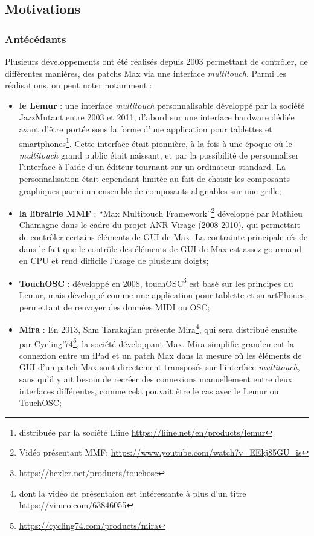 \subsection{Motivations}

\subsubsection{Antécédants} 

\noindent Plusieurs développements ont été réalisés depuis 2003 permettant de contrôler, de différentes manières, des patchs Max via une interface \textit{multitouch}. Parmi les réalisations, on peut noter notamment :
\vspace{-1em}
\begin{itemize}[noitemsep]
	\item \textbf{le Lemur} : une interface \textit{multitouch} personnalisable développé par la société JazzMutant entre 2003 et 2011, d'abord sur une interface hardware dédiée avant d'être portée sous la forme d'une application pour tablettes et smartphones\footnote{distribuée par la société Liine \url{https://liine.net/en/products/lemur}}. Cette interface était pionnière, à la fois à une époque où le \textit{multitouch} grand public était naissant, et par la possibilité de personnaliser l'interface à l'aide d'un éditeur tournant sur un ordinateur standard. La personnalisation était cependant limitée au fait de choisir les composants graphiques parmi un ensemble de composants alignables sur une grille;

	\item \textbf{la librairie MMF} : ``Max Multitouch Framework''\footnote{Vidéo présentant MMF: \url{https://www.youtube.com/watch?v=EEkj85GU_is}} développé par Mathieu Chamagne dans le cadre du projet \gls{ANR} Virage (2008-2010), qui permettait de contrôler certains éléments de \gls{GUI} de Max. La contrainte principale réside dans le fait que le contrôle des éléments de \gls{GUI} de Max est assez gourmand en \gls{CPU} et rend difficile l'usage de plusieurs doigts;

	\item \textbf{TouchOSC} : développé en 2008, touchOSC\footnote{\url{https://hexler.net/products/touchosc}} est basé sur les principes du Lemur, mais développé comme une application pour tablette et smartPhones, permettant de renvoyer des données \gls{MIDI} ou \gls{OSC};

	\item \textbf{Mira} : En 2013, Sam Tarakajian présente Mira\footnote{dont la vidéo de présentaion est intéressante à plus d'un titre \url{https://vimeo.com/63846055}}, qui sera distribué ensuite par Cycling'74\footnote{\url{https://cycling74.com/products/mira}}, la société développant Max. Mira simplifie grandement la connexion entre un iPad et un patch Max dans la mesure où les éléments de \gls{GUI} d'un patch Max sont directement transposés sur l'interface \textit{multitouch}, sans qu'il y ait besoin de recréer des connexions manuellement entre deux interfaces différentes, comme cela pouvait être le cas avec le Lemur ou TouchOSC;


\end{itemize}
